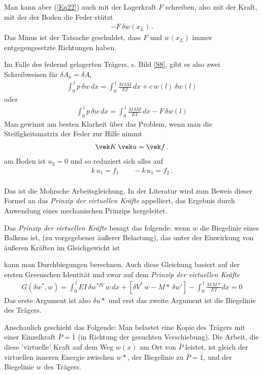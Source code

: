 Man kann aber (\ref{Eq22}) auch mit der Lagerkraft $F$ schreiben, also mit der  Kraft, mit der der Boden die Feder st\"{u}tzt
\begin{align} \label{Eq22}
-F\,\delta w(x_L) \,.
\end{align}
Das Minus ist der Tatsache geschuldet, dass $F $ und $w(x_L) $ immer entgegengesetzte Richtungen haben.

Im Falle des federnd gelagerten Tr\"{a}gers, s. Bild \ref{S8}, gibt es also zwei Schreibweisen f\"{u}r $\delta A_a = \delta A_i$
\begin{align}
\int_0^{\,l} p\,\delta w\,dx = \int_0^{\,l} \frac{M\,\delta M}{EI}\,dx + c\,w(l)\,\delta w(l)
\end{align}
oder
\begin{align}
\int_0^{\,l} p\,\delta w\,dx = \int_0^{\,l} \frac{M\,\delta M}{EI}\,dx - F\,\delta w(l)
\end{align}
Man gewinnt am besten Klarheit \"{u}ber das Problem, wenn man die Steifigkeitsmatrix der Feder zur Hilfe nimmt
\begin{align}
\vek  K\,\vek u = \vek f\,.
\end{align}
am Boden ist $u_2 = 0 $ und so reduziert sich alles auf
\begin{align}
k\,u_1 = f_1 \qquad -k\,u_1 = f_2\,.
\end{align}
\\

Das ist die Mohrsche Arbeitsgleichung. In der Literatur wird zum Beweis dieser Formel an das {\em Prinzip der virtuellen Kr\"{a}fte\/} appelliert, das Ergebnis durch Anwendung eines mechanischen Prinzips hergeleitet.

Das {\em Prinzip der virtuellen Kr\"{a}fte\/} besagt das folgende: wenn $w$ die Biegelinie eines Balkens ist, (zu vorgegebener \"{a}u{\ss}erer Belastung), das unter der Einwirkung von \"{a}u{\ss}eren Kr\"{a}ften im Gleichgewicht ist


 kann man Durchbiegungen berechnen. Auch diese Gleichung basiert auf der ersten Greenschen Identit\"{a}t und zwar auf dem {\em Prinzip der virtuellen Kr\"{a}fte\/}
\begin{align}
G(\delta w^*,w) = \int_0^{\,l} EI\,\delta w^{*IV}\,w\,dx + [\delta V^*\,w - M*\,\delta w'] - \int_0^{\,l} \frac{M\,M*}{EI} dx = 0
\end{align}
Das erste Argument ist also $\delta u*$ und erst das zweite Argument ist die Biegelinie des Tr\"{a}gers.

Anschaulich geschieht das Folgende: Man belastet eine Kopie des Tr\"{a}gers mit einer Einzelkraft $\bar{P} = \bar{1}$ (in Richtung der gesuchten Verschiebung). Die Arbeit, die diese 'virtuelle' Kraft auf dem Weg $w(x)$ am Ort von $\bar{P}$ leistet, ist gleich der virtuellen inneren Energie zwischen $w*$, der Biegelinie zu $\bar{P} = \bar{1}$, und der Biegelinie $w$ des Tr\"{a}gers.\\

